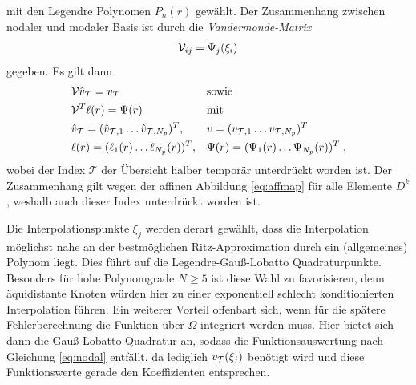 mit den Legendre Polynomen $P_n(r)$ gewählt. Der Zusammenhang zwischen nodaler und modaler Basis ist durch die \emph{Vandermonde-Matrix}
\begin{equation}
  \begin{aligned}
    \mathcal{V}_{ij} = \Psi_j(\xi_i)
  \end{aligned}
  \label{eq:vandermonde}
\end{equation}
gegeben. Es gilt dann
  \begin{align}
    &\mathcal{V}\hat{v}_{\mathcal{T}} = v_{\mathcal{T}}        & &\text{sowie} \label{eq:nodalmodal}\\
    &\mathcal{V}^T\ell(r) = \Psi(r) & &\text{mit} \label{eq:ellPsi}\\
    &\hat{v}_{\mathcal{T}} = (\hat{v}_{\mathcal{T},1} \dots \hat{v}_{\mathcal{T},N_p})^T, & & v =(v_{\mathcal{T},1} \dots v_{\mathcal{T},N_p})^T \nonumber \\
    &\ell(r) = (\ell_1(r) \dots \ell_{N_p}(r))^T, & & \Psi(r) =(\Psi_1(r) \dots \Psi_{N_p}(r))^T \nonumber \; ,
  \end{align}
wobei der Index $\mathcal{T}$ der Übersicht halber temporär unterdrückt worden ist. Der Zusammenhang gilt wegen der affinen Abbildung \eqref{eq:affmap} für alle Elemente $D^k$, weshalb auch dieser Index unterdrückt worden ist.

Die Interpolationspunkte $\xi_j$ werden derart gewählt, dass die Interpolation möglichst nahe an der bestmöglichen Ritz-Approximation durch ein (allgemeines) Polynom liegt. Dies führt auf die Legendre-Gauß-Lobatto Quadraturpunkte. Besonders für hohe Polynomgrade $N\geq 5$ ist diese Wahl zu favorisieren, denn äquidistante Knoten würden hier zu einer exponentiell schlecht konditionierten Interpolation führen. Ein weiterer Vorteil offenbart sich, wenn für die spätere Fehlerberechnung die Funktion über $\Omega$ integriert werden muss. Hier bietet sich dann die Gauß-Lobatto-Quadratur an, sodass die Funktionsauswertung nach Gleichung \eqref{eq:nodal} entfällt, da lediglich $v_{\mathcal{T}}(\xi_j)$ benötigt wird und diese Funktionswerte gerade den Koeffizienten entsprechen.

